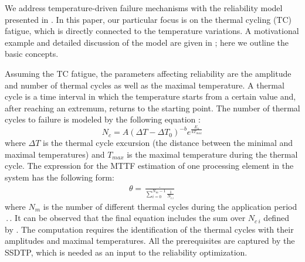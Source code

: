 We address temperature-driven failure mechanisms with the reliability model presented in \cite{huang2009, xiang2010}. In this paper, our particular focus is on the thermal cycling (TC) fatigue, which is directly connected to the temperature variations. A motivational example and detailed discussion of the model are given in ; here we outline the basic concepts.

Assuming the TC fatigue, the parameters affecting reliability are the amplitude and number of thermal cycles as well as the maximal temperature. A thermal cycle is a time interval in which the temperature starts from a certain value and, after reaching an extremum, returns to the starting point. The number of thermal cycles to failure is modeled by the following equation \cite{xiang2010, jedec2010}:
\begin{equation} \label{eq:cycles-to-failure}
  N_c = A (\Delta T - \Delta T_0)^{-b} e^{\frac{E_a}{k T_{max}}}
\end{equation}
where $\Delta T$ is the thermal cycle excursion (the distance between the minimal and maximal temperatures) and $T_{max}$ is the maximal temperature during the thermal cycle. The expression for the MTTF estimation of one processing element in the system has the following form:
\begin{align} \label{eq:one-mttf}
  \theta = \frac{\period}{\sum_{i=0}^{N_m - 1} \frac{1}{N_{c \: i}}}
\end{align}
where $N_m$ is the number of different thermal cycles during the application period $\period$. It can be observed that the final equation includes the sum over $N_{c \: i}$ defined by . The computation requires the identification of the thermal cycles with their amplitudes and maximal temperatures. All the prerequisites are captured by the SSDTP, which is needed as an input to the reliability optimization.
